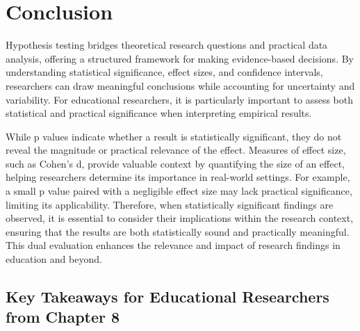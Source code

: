 \documentclass[
  letterpaper,
  DIV=11,
  numbers=noendperiod]{scrreprt}
\begin{document}
\chapter*{Conclusion}\label{conclusion-7}


Hypothesis testing bridges theoretical research questions and practical
data analysis, offering a structured framework for making evidence-based
decisions. By understanding statistical significance, effect sizes, and
confidence intervals, researchers can draw meaningful conclusions while
accounting for uncertainty and variability. For educational researchers,
it is particularly important to assess both statistical and practical
significance when interpreting empirical results.

While p values indicate whether a result is statistically significant,
they do not reveal the magnitude or practical relevance of the effect.
Measures of effect size, such as Cohen's d, provide valuable context by
quantifying the size of an effect, helping researchers determine its
importance in real-world settings. For example, a small p value paired
with a negligible effect size may lack practical significance, limiting
its applicability. Therefore, when statistically significant findings
are observed, it is essential to consider their implications within the
research context, ensuring that the results are both statistically sound
and practically meaningful. This dual evaluation enhances the relevance
and impact of research findings in education and beyond.

\section*{Key Takeaways for Educational Researchers from Chapter
8}\label{key-takeaways-for-educational-researchers-from-chapter-8}

\end{document}
